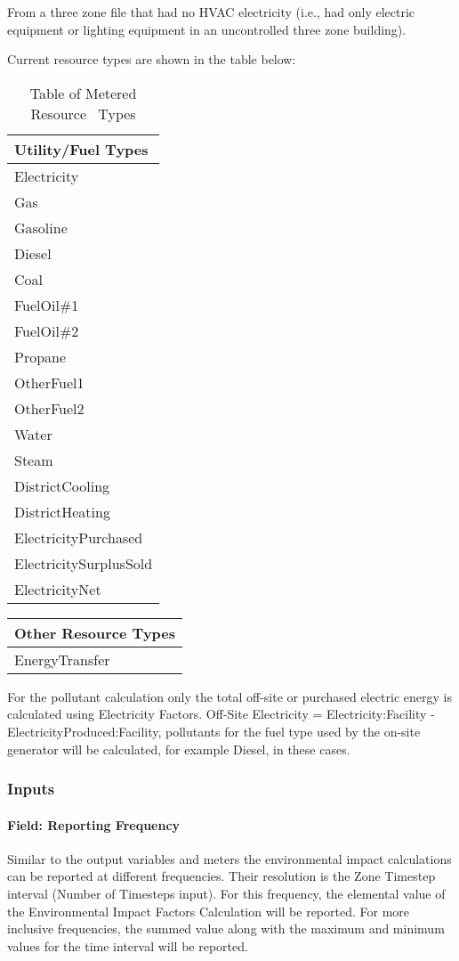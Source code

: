 From a three zone file that had no HVAC electricity (i.e., had only electric equipment or lighting equipment in an uncontrolled three zone building).

Current resource types are shown in the table below:

\begin{longtable}[c]{@{}l@{}}
\caption{Table of Metered Resource  Types \protect \label{table:table-of-metered-resource-types}}\\
\toprule 
Utility/Fuel Types \tabularnewline \midrule
\endhead
Electricity \tabularnewline
Gas \tabularnewline
Gasoline \tabularnewline
Diesel \tabularnewline
Coal \tabularnewline
FuelOil\#1 \tabularnewline
FuelOil\#2 \tabularnewline
Propane \tabularnewline
OtherFuel1 \tabularnewline
OtherFuel2 \tabularnewline
Water \tabularnewline
Steam \tabularnewline
DistrictCooling \tabularnewline
DistrictHeating \tabularnewline
ElectricityPurchased \tabularnewline
ElectricitySurplusSold \tabularnewline
ElectricityNet \tabularnewline
\bottomrule
\end{longtable}

\begin{longtable}[c]{@{}l@{}}
\toprule 
Other Resource Types \tabularnewline \midrule
\endhead
EnergyTransfer \tabularnewline
\bottomrule
\end{longtable}

For the pollutant calculation only the total off-site or purchased electric energy is calculated using Electricity Factors. Off-Site Electricity = Electricity:Facility - ElectricityProduced:Facility, pollutants for the fuel type used by the on-site generator will be calculated, for example Diesel, in these cases.

\subsubsection{Inputs}\label{inputs-9-017}

\paragraph{Field: Reporting Frequency}\label{field-reporting-frequency-1}

Similar to the output variables and meters the environmental impact calculations can be reported at different frequencies. Their resolution is the Zone Timestep interval (Number of Timesteps input). For this frequency, the elemental value of the Environmental Impact Factors Calculation will be reported. For more inclusive frequencies, the summed value along with the maximum and minimum values for the time interval will be reported.

